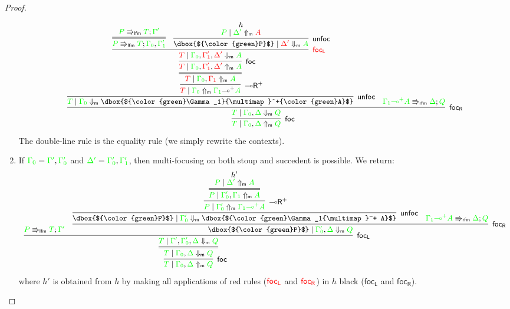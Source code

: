 \documentclass[runningheads]{llncs}
\newcommand{\lright}{{\multimap}\mathsf{R}}
\newcommand{\lolliR}{\lright}
\newcommand{\lolli}{\multimap}
\newcommand{\lfm}{\Rrightarrow_\mathsf{lfm}}
\newcommand{\rfm}{\Rrightarrow_\mathsf{rfm}}
\newcommand{\red}[1]{{\color{red}#1}}
\newcommand{\green}[1]{{\color{green}#1}}
\newcommand{\upm}{\Uparrow_{\mathsf{m}}}
\newcommand{\dnm}{\Downarrow_{\mathsf{m}}}
\newcommand{\focL}{\mathsf{foc_L}}
\newcommand{\foc}{\mathsf{foc}}
\newcommand{\focR}{\mathsf{foc_R}}
\newcommand{\unfoc}{\mathsf{unfoc}}
\begin{document}
\begin{proof}
\begin{enumerate}
    \[\small
    \infer[\foc]{\green{T} \mid \green{\Gamma_0},\green{\Delta} \upm \green{Q}}{
      \infer[\focR]{\green{T} \mid \green{\Gamma_0},\green{\Delta} \dnm \green{Q}}{
        \infer[\unfoc]{\green{T} \mid \green{\Gamma_0} \dnm \dbox{$\green{\Gamma_1}{\lolli}^+\green{A}$}}{
          \infer[\lolliR^+]{\red{T} \mid \green{\Gamma_0} \upm \green{\Gamma_1}{\lolli}^+\green{A}}{
            \infer={\red{T} \mid \green{\Gamma_0},\red{\Gamma_1} \upm \green{A}}{
              \infer[\foc]{\red{T} \mid \green{\Gamma_0},\red{\Gamma'_1},\red{\Delta'}\upm \green{A}}{
                \infer[\red{\focL}]{\red{T} \mid \green{\Gamma_0},\red{\Gamma'_1},\red{\Delta'} \dnm \green{A}}{
                  \infer={\green{P} \lfm \green{T} ; \green{\Gamma_0},\green{\Gamma'_1}}{
                    \green{P} \lfm \green{T} ; \green{\Gamma'}
                  }
                  &
                  \infer[\unfoc]{\dbox{$\green{P}$} \mid \red{\Delta'} \dnm \green{A}}{
                    \deduce{\green{P} \mid \green{\Delta'} \upm \red{A}}{h}
                  }
                }
              }
            }            
          }
        }
        &
        \green{\green{\Gamma_1}{\lolli}^+ A} \rfm \green{\Delta} ; \green{Q}
      }
    }
    \]
    The double-line rule is the equality rule (we simply rewrite the contexts).    
  \item If $\green{\Gamma_0} = \green{\Gamma'},\green{\Gamma_{0}'}$ and $\green{\Delta'} = \green{\Gamma_{0}'},\green{\Gamma_{1}'}$, then multi-focusing on both stoup and succedent is possible. We return:
    \[\small
    \infer[\foc]{\green{T} \mid \green{\Gamma_0},\green{\Delta} \upm \green{Q}}{
      \infer={\green{T} \mid \green{\Gamma_0} ,\green{\Delta} \dnm \green{Q}}{
        \infer[\focL]{\green{T} \mid \green{\Gamma'},\green{\Gamma_{0}'},\green{\Delta} \dnm \green{Q}}{
          \green{P} \lfm \green{T} ; \green{\Gamma'}
          &
          \infer[\focR]{\dbox{$\green{P}$} \mid \green{\Gamma_{0}'},\green{\Delta} \dnm \green{Q}}{
            \infer[\unfoc]{\dbox{$\green{P}$} \mid \green{\Gamma_{0}'} \dnm \dbox{$\green{\Gamma_1{\lolli}^+ A}$}}{
              \infer[\lolliR^+]{\green{P} \mid \green{\Gamma_{0}'} \upm \green{\Gamma_1{\lolli}^+ A}}{
                \infer={\green{P} \mid \green{\Gamma_{0}'}, \green{\Gamma_1}\upm \green{A}}{
                \deduce{\green{P} \mid \green{\Delta'}\upm \green{A}}{h'}
                }
              }
            }
            &
            \green{\green{\Gamma_1}{\lolli}^+ A} \rfm \green{\Delta} ; \green{Q}
          }
        }
      }
    }
    \]
where $h'$ is obtained from $h$ by making all applications of red rules ($\red{\focL}$ and $\red{\focR}$) in $h$ black ($\focL$ and $\focR$).
  \end{enumerate}
\end{proof}
\end{document}
